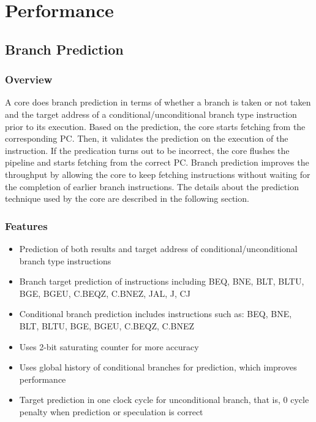 \documentclass[main\_\_EN.tex]{subfiles}
\begin{document}
\newpage
\section{Performance}
\label{sec:riscvcpu-perf-enhancements}


\subsection{Branch Prediction}
\label{sec:riscvcpu-perf-bp}

\subsubsection{Overview}
\label{sec:riscvcpu-perf-bp-overview}
A core does branch prediction in terms of whether a branch is taken or not taken and the target address of a conditional/unconditional branch type instruction prior to its execution. Based on the prediction, the core starts fetching from the corresponding PC. Then, it validates the prediction on the execution of the instruction. If the predication turns out to be incorrect, the core flushes the pipeline and starts fetching from the correct PC. Branch prediction improves the throughput by allowing the core to keep fetching instructions without waiting for the completion of earlier branch instructions. The details about the prediction technique used by the core are described in the following section.

\subsubsection{Features}
\label{sec:riscvcpu-perf-bp-features}
\begin{itemize}
    \item Prediction of both results and target address of conditional/unconditional branch type instructions
    \item Branch target prediction of instructions including BEQ, BNE, BLT, BLTU, BGE, BGEU, C.BEQZ, C.BNEZ, JAL, J, CJ
    \item Conditional branch prediction includes instructions such as: BEQ, BNE, BLT, BLTU, BGE, BGEU, C.BEQZ, C.BNEZ
    \item Uses 2-bit saturating counter for more accuracy
    \item Uses global history of conditional branches for prediction, which improves performance
    \item Target prediction in one clock cycle for unconditional branch, that is, 0 cycle penalty when prediction or speculation is correct
\end{itemize}
\end{document}
